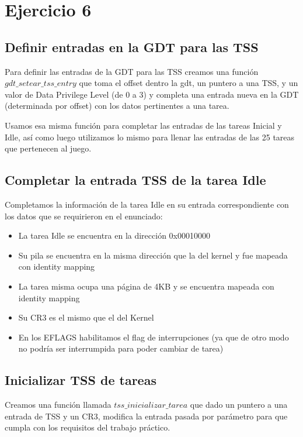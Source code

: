 \section{Ejercicio 6}

\subsection{Definir entradas en la GDT para las TSS}

Para definir las entradas de la GDT para las TSS creamos una función $gdt\_setear\_tss\_entry$ que toma el offset dentro la gdt, un puntero a una TSS, y un valor de Data Privilege Level (de 0 a 3) y completa una entrada nueva en la GDT (determinada por offset) con los datos pertinentes a una tarea.

Usamos esa misma función para completar las entradas de las tareas Inicial y Idle, así como luego utilizamos lo mismo para llenar las entradas de las 25 tareas que pertenecen al juego.

\subsection{Completar la entrada TSS de la tarea Idle}

Completamos la información de la tarea Idle en su entrada correspondiente con los datos que se requirieron en el enunciado:

\begin{itemize}
	\item La tarea Idle se encuentra en la dirección 0x00010000
	\item Su pila se encuentra en la misma dirección que la del kernel y fue mapeada con identity mapping
	\item La tarea misma ocupa una página de 4KB y se encuentra mapeada con identity mapping
	\item Su CR3 es el mismo que el del Kernel
	\item En los EFLAGS habilitamos el flag de interrupciones (ya que de otro modo no podría ser interrumpida para poder cambiar de tarea)
\end{itemize}

\subsection{Inicializar TSS de tareas}

Creamos una función llamada $tss\_inicializar\_tarea$ que dado un puntero a una entrada de TSS y un CR3, modifica la entrada pasada por parámetro para que cumpla con los requisitos del trabajo práctico.

